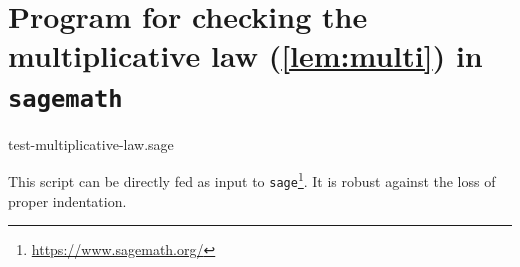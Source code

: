 \documentclass[a4paper,cleveref, autoref, thm-restate]{lipics-v2021}
\newif\ifnotkurz
\begin{document}



\ifnotkurz

\medbreak
 
\fi

\clearpage

\section{Program for checking the multiplicative law (\autoref{lem:multi}) in \texttt{sagemath}}
\label{sec:check}

\nolinenumbers


{test-multiplicative-law.sage}


This script %
can be directly fed as input to \texttt{sage}\footnote
{\url{https://www.sagemath.org/}}. It is
robust
against the loss of proper indentation.



\end{document}

